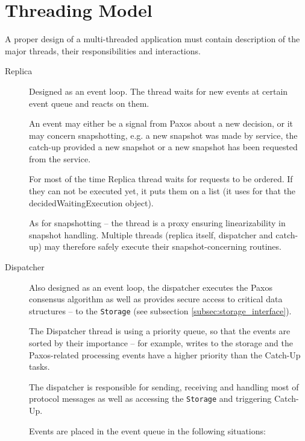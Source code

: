 \section{Threading Model}
\label{sec:threads}

A proper design of a multi-threaded application %
must contain description of the major threads, their responsibilities and interactions. 

\begin{description}
  \item[Replica] \hfill
    
    Designed as an event loop. The thread %
    waits for new events at certain event queue and reacts on them.

    An event may either be a signal from Paxos about a new decision, or it may concern snapshotting, e.g. a new snapshot was made by service, the catch-up provided a new snapshot or a new snapshot has been requested from the service.

    For most of the time Replica thread waits for requests to be ordered. If they can not be executed yet, it puts them on a list (it uses for that %
    the decidedWaitingExecution object).
    
    As for snapshotting -- the thread is a proxy ensuring linearizability in snapshot handling.
    Multiple threads (replica itself, dispatcher and catch-up) may therefore safely execute their snapshot-concerning routines.
    
  \item[Dispatcher] \hfill \nopagebreak
    
    Also designed as an event loop, the dispatcher executes the Paxos consensus algorithm as well as provides secure access to critical data structures -- to the \texttt{Storage} (see subsection \ref{subsec:storage_interface}).
    
    The Dispatcher thread is using a priority queue, so that the events are sorted by their importance -- for example, writes to the storage and the Paxos-related processing events have a higher priority than the Catch-Up tasks.
    
    The dispatcher is responsible for sending, receiving and handling most of protocol messages as well as accessing the \texttt{Storage} and triggering Catch-Up.
    
    Events are placed in the event queue in the following situations:
    


\end{description}
